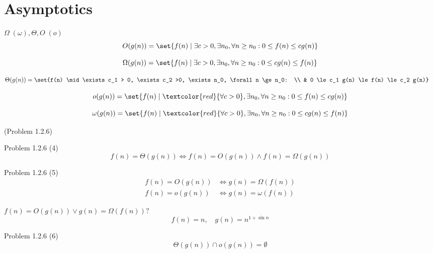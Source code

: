 \section{Asymptotics}

\begin{frame}{$\Omega\;(\omega), \Theta, O\;(o)$}
  \[
    O(g(n)) = \set{f(n) \mid \exists c > 0, \exists n_0, \forall n \ge n_0: 0 \le f(n) \le c g(n)}
  \]

  \pause

  \[
    \Omega(g(n)) = \set{f(n) \mid \exists c > 0, \exists n_0, \forall n \ge n_0: 0 \le c g(n) \le f(n)}
  \]

  \pause

  \begin{align*}
    \Theta(g(n)) &= \set{f(n) \mid \exists c_1 > 0, \exists c_2 >0, \exists n_0, \forall n \ge n_0: \\ 
		& 0 \le c_1 g(n) \le f(n) \le c_2 g(n)}
  \end{align*}

  \pause

  \[
	  o(g(n)) = \set{f(n) \mid \textcolor{red}{\forall c > 0}, \exists n_0, \forall n \ge n_0: 0 \le f(n) \le c g(n)}
  \]

  \pause

  \[
	  \omega(g(n)) = \set{f(n) \mid \textcolor{red}{\forall c > 0}, \exists n_0, \forall n \ge n_0: 0 \le c g(n) \le f(n)}
  \]
\end{frame}
\begin{frame}{(Problem 1.2.6)}
  \begin{exampleblock}{Problem 1.2.6 (4)}
	\[
		f(n) = \Theta(g(n)) \iff f(n) = O(g(n)) \land f(n) = \Omega(g(n))
	\]
  \end{exampleblock}

  \pause

  \begin{exampleblock}{Problem 1.2.6 (5)}
	\begin{align*}
	  f(n) = O(g(n)) &\iff g(n) = \Omega(f(n)) \\
	  f(n) = o(g(n)) &\iff g(n) = \omega(f(n))
	\end{align*}
  \end{exampleblock}

  \pause
  
  \begin{alertblock}{$f(n) = O(g(n)) \lor g(n) = \Omega(f(n)) ?$}
	\pause
	\[
		f(n) = n, \quad g(n) = n^{1 + \sin n}
	\]
  \end{alertblock}

  \pause

  \begin{exampleblock}{Problem 1.2.6 (6)}
	\[
		\Theta(g(n)) \cap o(g(n)) = \emptyset
	\]
  \end{exampleblock}
\end{frame}
